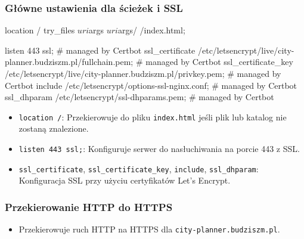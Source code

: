 \subsubsection{Główne ustawienia dla ścieżek i SSL}
\begin{longlisting}[language=nginx,label={lst:n7}]
  location / {
    try_files $uri$args $uri$args/ /index.html;
  }

  listen 443 ssl; # managed by Certbot
  ssl_certificate /etc/letsencrypt/live/city-planner.budziszm.pl/fullchain.pem; # managed by Certbot
  ssl_certificate_key /etc/letsencrypt/live/city-planner.budziszm.pl/privkey.pem; # managed by Certbot
  include /etc/letsencrypt/options-ssl-nginx.conf; # managed by Certbot
  ssl_dhparam /etc/letsencrypt/ssl-dhparams.pem; # managed by Certbot
\end{longlisting}
\begin{itemize}
    \item \texttt{location /}: Przekierowuje do pliku \texttt{index.html} jeśli plik lub katalog nie zostaną znalezione.
    \item \texttt{listen 443 ssl;}: Konfiguruje serwer do nasłuchiwania na porcie 443 z SSL\@.
    \item \texttt{ssl\_certificate}, \texttt{ssl\_certificate\_key}, \texttt{include}, \texttt{ssl\_dhparam}: Konfiguracja SSL przy użyciu certyfikatów Let's Encrypt.
\end{itemize}

\subsubsection{Przekierowanie HTTP do HTTPS}
\begin{itemize}
    \item Przekierowuje ruch HTTP na HTTPS dla \texttt{city-planner.budziszm.pl}.
\end{itemize}

